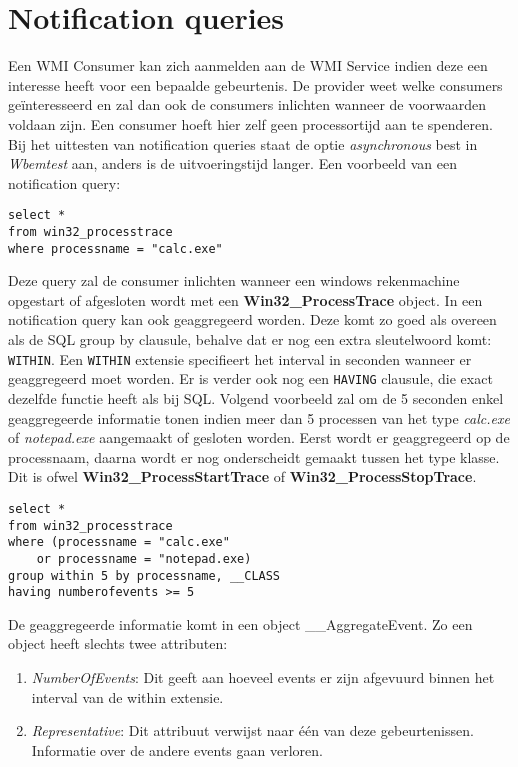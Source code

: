 \documentclass{report}
\begin{document}
	\section{Notification queries}
	Een WMI Consumer kan zich aanmelden aan de WMI Service indien deze een interesse heeft voor een bepaalde gebeurtenis. De provider weet welke consumers geïnteresseerd en zal dan ook de consumers inlichten wanneer de voorwaarden voldaan zijn. Een consumer hoeft hier zelf geen processortijd aan te spenderen. Bij het uittesten van notification queries staat de optie \textit{asynchronous} best in \textit{Wbemtest} aan, anders is de uitvoeringstijd langer. Een voorbeeld van een notification query:
	\begin{lstlisting}
select * 
from win32_processtrace
where processname = "calc.exe"
	\end{lstlisting}
	Deze query zal de consumer inlichten wanneer een windows rekenmachine opgestart of afgesloten wordt met een \textbf{Win32\_ProcessTrace} object. In een notification query kan ook geaggregeerd worden. Deze komt zo goed als overeen als de SQL group by clausule, behalve dat er nog een extra sleutelwoord komt: \texttt{WITHIN}. Een \texttt{WITHIN} extensie specifieert het interval in seconden wanneer er geaggregeerd moet worden. Er is verder ook nog een \texttt{HAVING} clausule, die exact dezelfde functie heeft als bij SQL. Volgend voorbeeld zal om de 5 seconden enkel geaggregeerde informatie tonen indien meer dan 5 processen van het type \textit{calc.exe} of \textit{notepad.exe} aangemaakt of gesloten worden. Eerst wordt er geaggregeerd op de processnaam, daarna wordt er nog onderscheidt gemaakt tussen het type klasse. Dit is ofwel \textbf{Win32\_ProcessStartTrace} of \textbf{Win32\_ProcessStopTrace}.
	\begin{lstlisting}
select * 
from win32_processtrace
where (processname = "calc.exe"
    or processname = "notepad.exe)
group within 5 by processname, __CLASS
having numberofevents >= 5
	\end{lstlisting}
	
	De geaggregeerde informatie komt in een object \_\_AggregateEvent. Zo een object heeft slechts twee attributen:
	\begin{enumerate}
		\item \textit{NumberOfEvents}: Dit geeft aan hoeveel events er zijn afgevuurd binnen het interval van de within extensie.
		\item \textit{Representative}: Dit attribuut verwijst naar één van deze gebeurtenissen. Informatie over de andere events gaan verloren.
	\end{enumerate}
\end{document}
